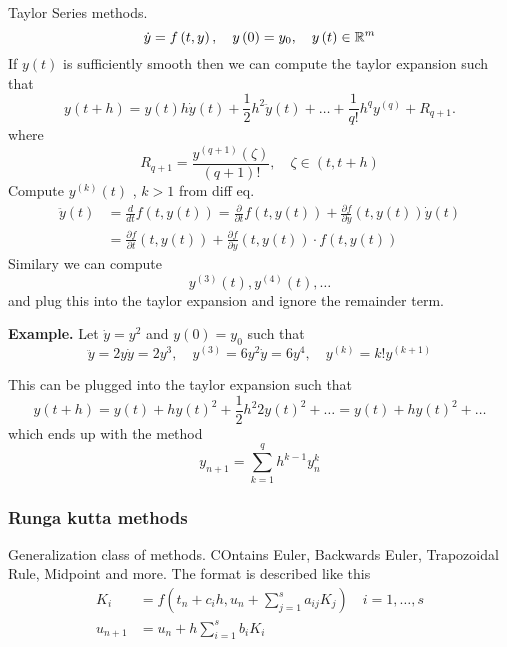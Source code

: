 \documentclass{article}
\theoremstyle{remark}
\begin{document}
Taylor Series methods. \[
\dot{y} = f\left( t, y \right) , \quad  y\left( 0 \right) = y_{0} , \quad  y\left( t \right) \in  \mathbb{R} ^{m}  \\
\]  
If $y\left( t \right)  $ is sufficiently smooth then we can compute the taylor expansion such that \[
y \left( t+ h \right) = y\left( t \right) h \dot{y} \left( t \right) + \frac{1}{2} h^2 \ddot{y}\left( t \right) + \ldots + \frac{1}{q!} h^{q} y^{(q)} + R_{q+1}  .
\] 
where \[
R_{q+1} = \frac{y^{(q+1) }\left( \zeta  \right)}{ \left( q +1 \right) !}  , \quad  \zeta  \in  \left( t, t+h \right) 
\] 
Compute $y ^{(k)} \left( t \right)$ , $k>1$ from diff eq. \[
  \begin{split}
\ddot{y} \left( t \right)  & = \frac{d }{dt } f\left( t, y\left( t \right) \right) = \frac{\partial }{\partial t} f \left( t, y\left( t \right) \right) + \frac{\partial f}{\partial y}  \left( t, y\left( t \right)   \right) \dot{y}\left( t \right)  \\
 & = \frac{\partial f}{\partial t}  \left( t, y\left( t \right) \right) +\frac{\partial f}{\partial y} \left( t, y\left( t \right) \right) \cdot f\left( t, y\left( t \right) \right)
  \end{split} 
\] 
Similary we can compute \[
y^{(3)}\left( t \right) , y^{(4) }\left( t \right) , \ldots
\]  
and plug this into the taylor expansion and ignore the remainder term. 

\newpara
\textbf{Example.} 
Let $\dot{y} = y^2$ and $y\left( 0 \right) = y_{0}$ such that \[
\ddot{y} = 2y \dot{y} = 2y^3, \quad y^{(3) } = 6 y^2\dot{y} = 6y^{4} , \quad y^{(k)} = k! y^{(k+1)}  
\] 

This can be plugged into the taylor expansion such that \[
y\left( t + h \right) = y\left( t \right) + h y\left( t \right)^2 + \frac{1}{2} h^2 2 y\left( t \right)^2 + \ldots = y\left( t \right) + hy\left( t \right)^2 + \ldots
\]  
which ends up with the method \[
y_{n+1} = \sum_{k=1}^{ q}  h^{k-1} y ^{k}_{n}
\] 

\subsubsection{Runga kutta methods}%
\label{ssub:runga_kutta_methods}

Generalization class of methods. COntains Euler, Backwards Euler, Trapozoidal Rule, Midpoint and more. The format is described like this \[
  \begin{split}
K_{i}  & = f\left( t _{n} + c_{i}h, u_{n} + \sum_{j=1}^{s} a_{ij} K_{j}  \right) \quad  i =  1, \ldots, s  \\
u_{n+1}  & = u_{n} + h \sum_{i=1}^{s}  b_{i} K_{i}
  \end{split} 
\] 
\end{document}
